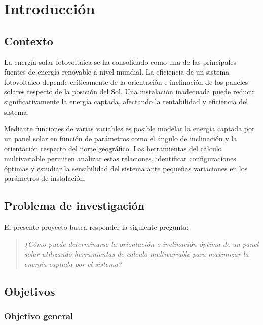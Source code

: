 \documentclass[12pt,a4paper]{article}
\begin{document}

\clearpage

\tableofcontents
\clearpage

\section{Introducción}

\subsection{Contexto}

La energía solar fotovoltaica se ha consolidado como una de las principales fuentes de energía renovable a nivel mundial. La eficiencia de un sistema fotovoltaico depende críticamente de la orientación e inclinación de los paneles solares respecto de la posición del Sol. Una instalación inadecuada puede reducir significativamente la energía captada, afectando la rentabilidad y eficiencia del sistema.

Mediante funciones de varias variables es posible modelar la energía captada por un panel solar en función de parámetros como el ángulo de inclinación y la orientación respecto del norte geográfico. Las herramientas del cálculo multivariable permiten analizar estas relaciones, identificar configuraciones óptimas y estudiar la sensibilidad del sistema ante pequeñas variaciones en los parámetros de instalación.

\subsection{Problema de investigación}

El presente proyecto busca responder la siguiente pregunta:

\begin{quote}
\itshape
¿Cómo puede determinarse la orientación e inclinación óptima de un panel solar utilizando herramientas de cálculo multivariable para maximizar la energía captada por el sistema?
\end{quote}

\subsection{Objetivos}

\subsubsection{Objetivo general}
\end{document}
